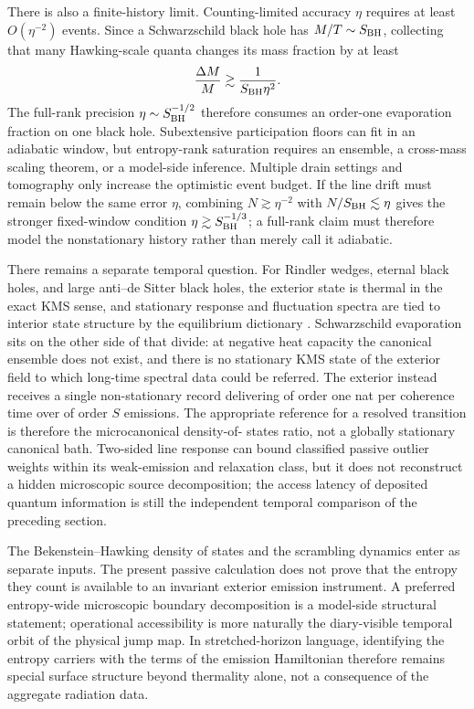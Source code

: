 \documentclass[12pt]{article}
\newcommand{\be}{\begin{equation}}
\newcommand{\ee}{\end{equation}}
\begin{document}
There is also a finite-history limit.  Counting-limited accuracy $\eta$
requires at least $O(\eta^{-2})$ events.  Since a Schwarzschild black hole has
$M/T\sim S_{\rm BH}$, collecting that many Hawking-scale quanta changes its
mass fraction by at least
\be
 \frac{\Delta M}{M}\gtrsim
 \frac{1}{S_{\rm BH}\eta^2}.
\ee
The full-rank precision $\eta\sim S_{\rm BH}^{-1/2}$ therefore consumes an
order-one evaporation fraction on one black hole.  Subextensive participation
floors can fit in an adiabatic window, but entropy-rank saturation requires an
ensemble, a cross-mass scaling theorem, or a model-side inference.  Multiple
drain settings and tomography only increase the optimistic event budget.  If
the line drift must remain below the same error $\eta$, combining
$N\gtrsim\eta^{-2}$ with $N/S_{\rm BH}\lesssim\eta$ gives the stronger
fixed-window condition $\eta\gtrsim S_{\rm BH}^{-1/3}$; a full-rank claim must
therefore model the nonstationary history rather than merely call it
adiabatic.

There remains a separate temporal question.  For Rindler wedges,
eternal black holes, and large anti--de Sitter black holes, the exterior
state is thermal in the exact KMS sense, and stationary response and
fluctuation spectra are tied to interior state structure by the
equilibrium dictionary
\cite{BisognanoWichmann1976,Israel1976,GibbonsHawkingAction1977,
HawkingPage1983}.  Schwarzschild evaporation sits on the other side of
that divide: at negative heat capacity the canonical ensemble does not
exist, and there is no stationary KMS state of the exterior field to
which long-time spectral data could be referred.  The exterior instead
receives a single non-stationary record delivering of order one nat per
coherence time over of order $S$ emissions.  The appropriate reference
for a resolved transition is therefore the microcanonical density-of-
states ratio, not a globally stationary canonical bath.  Two-sided line
response can bound classified passive outlier weights within its
weak-emission and relaxation class, but it does not reconstruct a hidden
microscopic source decomposition; the access latency of deposited
quantum information is still the independent temporal comparison of
the preceding section.

The Bekenstein--Hawking density of states and the scrambling dynamics
enter as separate inputs.  The present passive calculation does not prove that
the entropy they count is available to an invariant exterior emission
instrument.  A preferred entropy-wide microscopic boundary decomposition is a
model-side structural statement; operational accessibility is more naturally
the diary-visible temporal orbit of the physical jump map.  In
stretched-horizon language, identifying the entropy carriers with the terms of
the emission Hamiltonian therefore remains special surface structure beyond
thermality alone, not a consequence of the aggregate radiation data.
\end{document}
